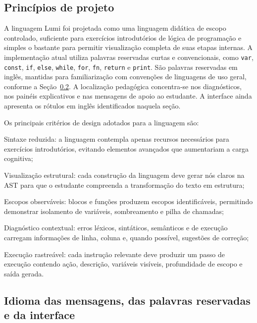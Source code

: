 \documentclass[
    12pt
    ,oneside
    ,a4paper
    ,chapter=TITLE
    ,section=TITLE
    ,sumario=abnt-6027-2012]{abntex2}
\begin{document}
\subsection{Princípios de projeto}

A linguagem Lumi foi projetada como uma linguagem didática de escopo controlado, suficiente para
exercícios introdutórios de lógica de programação e simples o bastante para permitir visualização
completa de suas etapas internas. A implementação atual utiliza palavras reservadas curtas e
convencionais, como \texttt{var}, \texttt{const}, \texttt{if}, \texttt{else}, \texttt{while},
\texttt{for}, \texttt{fn}, \texttt{return} e \texttt{print}. São palavras reservadas em
inglês, mantidas para familiarização com convenções de linguagens de uso geral,
conforme a Seção~\ref{sec:idioma_lumi}. A localização pedagógica concentra-se nos
diagnósticos, nos painéis explicativos e nas mensagens de apoio ao estudante.
A interface ainda apresenta os rótulos em inglês identificados naquela seção.

Os principais critérios de design adotados para a linguagem são:

\begin{alineas}
    \item Sintaxe reduzida: a linguagem contempla apenas recursos necessários para exercícios introdutórios, evitando elementos avançados que aumentariam a carga cognitiva;
    \item Visualização estrutural: cada construção da linguagem deve gerar nós claros na AST para que o estudante compreenda a transformação do texto em estrutura;
    \item Escopos observáveis: blocos e funções produzem escopos identificáveis, permitindo demonstrar isolamento de variáveis, sombreamento e pilha de chamadas;
    \item Diagnóstico contextual: erros léxicos, sintáticos, semânticos e de execução carregam informações de linha, coluna e, quando possível, sugestões de correção;
    \item Execução rastreável: cada instrução relevante deve produzir um passo de execução contendo ação, descrição, variáveis visíveis, profundidade de escopo e saída gerada.
\end{alineas}

\subsection{Idioma das mensagens, das palavras reservadas e da interface}
\label{sec:idioma_lumi}
\end{document}
